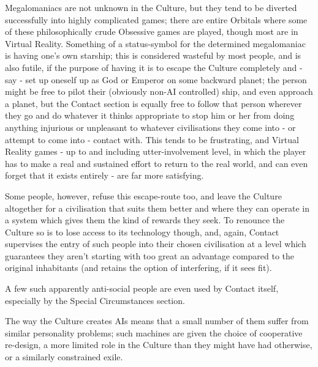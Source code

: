 Megalomaniacs are not unknown in the Culture, but they tend to be diverted successfully into highly complicated games; there are entire Orbitals where some of these philosophically crude Obsessive games are played, though most are in Virtual Reality. Something of a status-symbol for the determined megalomaniac is having one's own starship; this is considered wasteful by most people, and is also futile, if the purpose of having it is to escape the Culture completely and - say - set up oneself up as God or Emperor on some backward planet; the person might be free to pilot their (obviously non-AI controlled) ship, and even approach a planet, but the Contact section is equally free to follow that person wherever they go and do whatever it thinks appropriate to stop him or her from doing anything injurious or unpleasant to whatever civilisations they come into - or attempt to come into - contact with. This tends to be frustrating, and Virtual Reality games - up to and including utter-involvement level, in which the player has to make a real and sustained effort to return to the real world, and can even forget that it exists entirely - are far more satisfying.

Some people, however, refuse this escape-route too, and leave the Culture altogether for a civilisation that suits them better and where they can operate in a system which gives them the kind of rewards they seek. To renounce the Culture so is to lose access to its technology though, and, again, Contact supervises the entry of such people into their chosen civilisation at a level which guarantees they aren't starting with too great an advantage compared to the original inhabitants (and retains the option of interfering, if it sees fit).

A few such apparently anti-social people are even used by Contact itself, especially by the Special Circumstances section.

The way the Culture creates AIs means that a small number of them suffer from similar personality problems; such machines are given the choice of cooperative re-design, a more limited role in the Culture than they might have had otherwise, or a similarly constrained exile.

